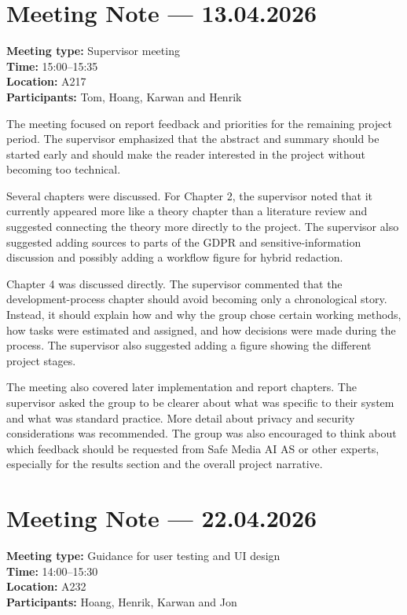 \section{Meeting Note --- 13.04.2026}
\label{app:meeting-2026-04-13}
\textbf{Meeting type:} Supervisor meeting\\
\textbf{Time:} 15:00--15:35\\
\textbf{Location:} A217\\
\textbf{Participants:} Tom, Hoang, Karwan and Henrik

The meeting focused on report feedback and priorities for the remaining project period. The supervisor emphasized that the abstract and summary should be started early and should make the reader interested in the project without becoming too technical.

Several chapters were discussed. For Chapter 2, the supervisor noted that it currently appeared more like a theory chapter than a literature review and suggested connecting the theory more directly to the project. The supervisor also suggested adding sources to parts of the GDPR and sensitive-information discussion and possibly adding a workflow figure for hybrid redaction.

Chapter 4 was discussed directly. The supervisor commented that the development-process chapter should avoid becoming only a chronological story. Instead, it should explain how and why the group chose certain working methods, how tasks were estimated and assigned, and how decisions were made during the process. The supervisor also suggested adding a figure showing the different project stages.

The meeting also covered later implementation and report chapters. The supervisor asked the group to be clearer about what was specific to their system and what was standard practice. More detail about privacy and security considerations was recommended. The group was also encouraged to think about which feedback should be requested from Safe Media AI AS or other experts, especially for the results section and the overall project narrative.

\section{Meeting Note --- 22.04.2026}
\label{app:meeting-2026-04-22}
\textbf{Meeting type:} Guidance for user testing and UI design\\
\textbf{Time:} 14:00--15:30\\
\textbf{Location:} A232\\
\textbf{Participants:} Hoang, Henrik, Karwan and Jon

